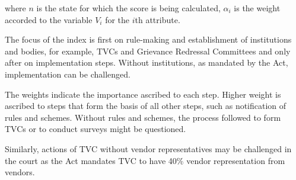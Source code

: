\documentclass[a4paper, 12pt, twoside]{article}
\begin{document}
{{where $n$ is the state for which the score is being calculated, $\alpha_i$ is the weight accorded to the variable $V_i$ for the $i$th attribute.

The focus of the index is first on rule-making and establishment of institutions and bodies, for example, TVCs and Grievance Redressal Committees and only after on implementation steps. Without institutions, as mandated by the Act, implementation can be challenged.

The weights indicate the importance ascribed to each step. Higher weight is ascribed to steps that form the basis of all other steps, such as notification of rules and schemes. Without rules and schemes, the process followed to form TVCs or to conduct surveys might be questioned.

Similarly, actions of TVC without vendor representatives may be challenged in the court as the Act mandates TVC to have 40\% vendor representation from vendors.

}}
\end{document}
